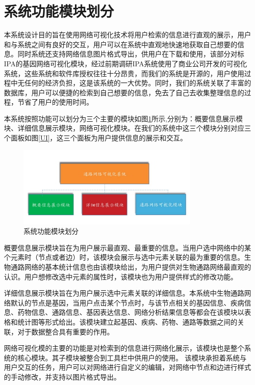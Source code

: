 \section{系统功能模块划分}
本系统设计目的旨在使用网络可视化技术将用户检索的信息进行直观的展示，用户和与系统之间有良好的交互，用户可以在系统中直观地快速地获取自己想要的信息。同时系统还支持网络信息图片格式导出，供用户在下载和使用，该部分对标IPA的基因网络可视化模块，经过前期调研IPA系统使用了商业公司开发的可视化系统，这些系统和软件库授权往往十分昂贵，而我们的系统是开源的，用户使用过程中无任何的经济负担，这是该系统的一大优势。同时，我们的系统关联了丰富的数据库，用户可以便捷的检索到自己想要的信息，免去了自己去收集整理信息的过程，节省了用户的使用时间。

本系统按照功能可以划分为三个主要的模块如图\ref{fig32}所示,分别为：概要信息展示模块、详细信息展示模块，网络可视化模块。在我们的系统中这三个模块分别对应三个面板如图\ref{UI}，这三个面板为用户提供信息的展示和交互。

\begin{figure}[h]
\centering
\includegraphics[width = 0.8\textwidth]{module}
\caption[fig32]{系统功能模块划分}
\label{fig32}
\end{figure}

概要信息展示模块旨在为用户展示最直观、最重要的信息。当用户选中网络中的某个元素时（节点或者边）时，该模块会展示与选中元素关联的最为重要的信息。生物通路网络的基本统计信息也由该模块给出，为用户提供对生物通路网络最直观的认识。用户想修改选中元素的属性时，该模块也为用户提供样式的修改功能。

详细信息展示模块旨在为用户展示选中元素关联的详细信息。本系统中生物通路网络默认的节点是基因，当用户点击某个节点时，与该节点相关的基因信息、疾病信息、药物信息、通路信息、基因表达信息、网络分析结果信息等都会在该模块以表格和统计图等形式给出。该模块建立起基因、疾病、药物、通路等数据之间的关联，对于数据整合具有重要的作用。

网络可视化模的主要的功能是对检索到的信息进行网络化展示，该模块也是整个系统的核心模块。其子模块被整合到工具栏中供用户的使用。 该模块承担着系统与用户交互的任务，用户可以对网络进行自定义的编辑，对网络中节点和边进行样式的手动修改，并支持以图片格式导出。



